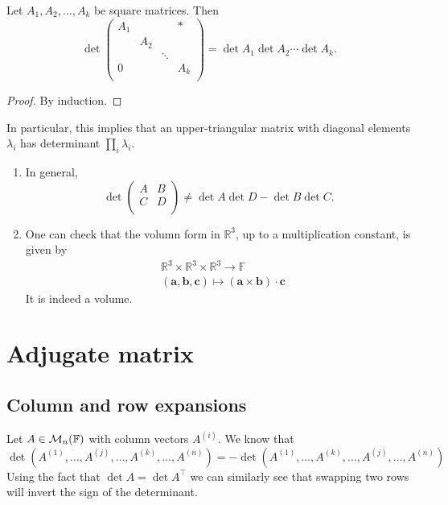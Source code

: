 \documentclass[a4paper,11pt]{article}
\begin{document}
\begin{corollary}
	Let $ A_1,A_2,\dots,A_k $ be square matrices. Then 
	\[
		\det \begin{pmatrix}
			A_1 &  &  &  * \\
			 & A_2 &  &   \\
			 &  & \ddots &   \\
			0 &  &  &  A_k \\
		\end{pmatrix}= \det A_1 \det A_2\cdots \det A_k. 
	\]
\end{corollary}
\begin{proof}
By induction. 
\end{proof}
In particular, this implies that an upper-triangular matrix with diagonal elements $ \lambda_i $ has determinant $ \prod_i \lambda_i $.
\begin{remark}
	\begin{enumerate}
		\item In general,
		\[
			\det \begin{pmatrix}
				A &  B \\
				C &  D \\
			\end{pmatrix}\neq \det A\det D - \det B \det C. 
		\]
		\item One can check that the volumn form in $ \mathbb{R}^{3} $, up to a multiplication constant, is given by 
		\begin{align*}
			& \mathbb{R}^{3} \times \mathbb{R}^{3} \times \mathbb{R}^{3} \to \mathbb{F}\\ 
			& (\mathbf{a},\mathbf{b},\mathbf{c}) \mapsto (\mathbf{a} \times \mathbf{b})\cdot \mathbf{c}
		\end{align*}
		It is indeed a volume. 
	\end{enumerate}
\end{remark}

\section{Adjugate matrix}

\subsection{Column and row expansions}
Let $ A \in {\mathcal{M}}_n({\mathbb{F}}) $ with column vectors $ A^{(i)} $.
We know that
\[
	\det(A^{(1)}, \dots, A^{(j)}, \dots, A^{(k)}, \dots, A^{(n)}) = -\det(A^{(1)}, \dots, A^{(k)}, \dots, A^{(j)}, \dots, A^{(n)})
\]
Using the fact that $ \det A = \det A^\top $ we can similarly see that swapping two rows will invert the sign of the determinant.
\end{document}
